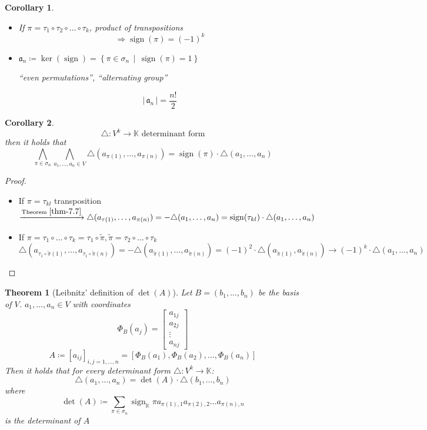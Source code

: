 \documentclass[a4paper,landscape,twocolumn]{article}
\newcommand\setdef[2]{\left\{#1\,\middle|\,#2\right\}}
\newcommand\card[1]{\left|\,#1\,\right|}
\newtheorem{theorem}{Theorem}
\newtheorem{cor}{Corollary}
\DeclareMathOperator\sign{sign}
\begin{document}
\begin{cor}
  \label{cor-7.18}
  \begin{itemize}
    \item If $\pi = \tau_1 \circ \tau_2 \circ \ldots \circ \tau_k$, product of transpositions
      \[ \Rightarrow \sign(\pi) = (-1)^k \]
    \item $\mathfrak a_n \coloneqq \ker(\sign) = \setdef{\pi \in \sigma_n}{\sign(\pi) = 1}$
      \begin{center} \enquote{even permutations}, \enquote{alternating group} \end{center}
      \[ \card{\mathfrak a_n} = \frac{n!}{2} \]
  \end{itemize}
\end{cor}
\begin{cor}
  \label{cor-7.19}
  \[ \triangle: V^k \to \mathbb K \text{ determinant form} \]
  then it holds that
  \[
    \bigwedge_{\pi \in \sigma_n} \bigwedge_{a_1, \ldots, a_n \in V}
    \triangle(a_{\pi(1)}, \ldots, a_{\pi(n)}) = \sign(\pi) \cdot \triangle(a_1, \ldots, a_n)
  \]
\end{cor}
\begin{proof}
  \begin{itemize}
    \item If $\pi = \tau_{kl}$ transposition $\xrightarrow{\text{Theorem~}\ref{thm-7.7}} \triangle(a_{\tau(1)}, \ldots, a_{\pi(n)})
      = -\triangle(a_1, \ldots, a_n) = \sign(\tau_{kl}) \cdot \triangle(a_1, \ldots, a_n)$
    \item If $\pi = \tau_1 \circ \ldots \circ \tau_k = \tau_1 \circ \tilde{\pi}, \tilde{\pi} = \tau_2 \circ \ldots \circ \tau_k$
      \[
        \triangle(a_{\tau_1 \circ \tilde{\pi}(1)}, \ldots, a_{\tau_1 \circ \tilde{\pi}(n)})
        = -\triangle(a_{\tilde\pi(1)}, \ldots, a_{\tilde\pi(n)})
        = (-1)^2 \cdot \triangle(a_{\tilde\pi(1)}, a_{\tilde\pi(n)})
        \to (-1)^k \cdot \triangle(a_1, \ldots, a_n)
      \]
  \end{itemize}
\end{proof}
\begin{theorem}[Leibnitz' definition of $\det(A)$]
  \label{satz-7.20}
  Let $B = (b_1, \ldots, b_n)$ be the basis of $V$. $a_1, \ldots, a_n \in V$ with coordinates
  \[ \Phi_B(a_j) = \begin{bmatrix} a_{1j} \\ a_{2j} \\ \vdots \\ a_{nj} \end{bmatrix} \]
  \[ A \coloneqq [a_{ij}]_{i,j=1,\ldots,n} = \left[\Phi_B(a_1), \Phi_B(a_2), \ldots, \Phi_B(a_n)\right] \]
  Then it holds that for every determinant form $\triangle: V^k \to \mathbb K$:
  \[ \triangle(a_1, \ldots, a_n) = \det(A) \cdot \triangle(b_1, \ldots, b_n) \]
  where
  \[ \det(A) \coloneqq \sum_{\pi \in \sigma_n} \sign_{\mathbb K} \pi a_{\pi(1),1} a_{\pi(2),2} \ldots a_{\pi(n),n} \]
  is the determinant of $A$
\end{theorem}
\end{document}
